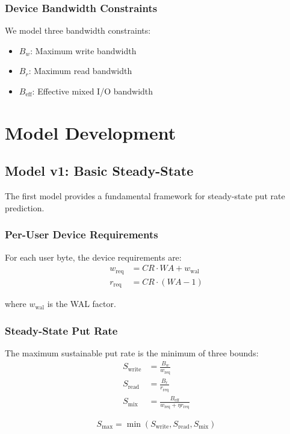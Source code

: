 \documentclass[11pt,twocolumn]{article}
\newcommand{\smax}{S_{\text{max}}}
\begin{document}
\subsubsection{Device Bandwidth Constraints}
We model three bandwidth constraints:
\begin{itemize}
    \item $B_w$: Maximum write bandwidth
    \item $B_r$: Maximum read bandwidth  
    \item $B_{\text{eff}}$: Effective mixed I/O bandwidth
\end{itemize}

\section{Model Development}

\subsection{Model v1: Basic Steady-State}

The first model provides a fundamental framework for steady-state put rate prediction.

\subsubsection{Per-User Device Requirements}
For each user byte, the device requirements are:
\begin{align}
w_{\text{req}} &= CR \cdot WA + w_{\text{wal}} \\
r_{\text{req}} &= CR \cdot (WA - 1)
\end{align}

where $w_{\text{wal}}$ is the WAL factor.

\subsubsection{Steady-State Put Rate}
The maximum sustainable put rate is the minimum of three bounds:
\begin{align}
S_{\text{write}} &= \frac{B_w}{w_{\text{req}}} \\
S_{\text{read}} &= \frac{B_r}{r_{\text{req}}} \\
S_{\text{mix}} &= \frac{B_{\text{eff}}}{w_{\text{req}} + \eta r_{\text{req}}}
\end{align}

\begin{equation}
\smax = \min(S_{\text{write}}, S_{\text{read}}, S_{\text{mix}})
\end{equation}
\end{document}
